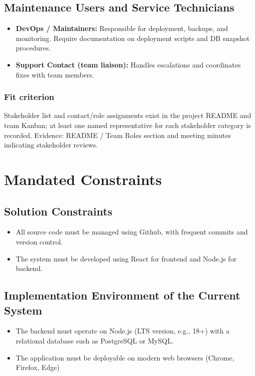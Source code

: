 \documentclass[12pt]{article}
\begin{document}
\subsection{Maintenance Users and Service Technicians}
\begin{itemize}
  \item \textbf{DevOps / Maintainers:} Responsible for deployment, backups, and monitoring. Require documentation on deployment scripts and DB snapshot procedures.
  \item \textbf{Support Contact (team liaison):} Handles escalations and coordinates fixes with team members.
\end{itemize}

\subsubsection*{Fit criterion}
Stakeholder list and contact/role assignments exist in the project README and team Kanban; at least one named representative for each stakeholder category is recorded. Evidence: README / Team Roles section and meeting minutes indicating stakeholder reviews.


\section{Mandated Constraints}
\subsection{Solution Constraints}
	\begin{itemize}
		\item All source code must be managed using Github, with frequent commits and version control.
		\item The system must be developed using React for frontend and Node.js for backend.
	\end{itemize}
\subsection{Implementation Environment of the Current System}
\begin{itemize}
		\item The backend must operate on Node.js (LTS version, e.g., 18+) with a relational database such as PostgreSQL or MySQL.
		\item The application must be deployable on modern web browsers (Chrome, Firefox, Edge)
	\end{itemize}
\end{document}
